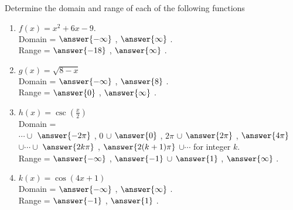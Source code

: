 \documentclass{ximera}
\author{Elizabeth Campolongo}
\begin{document}
\begin{exercise}
Determine the domain and range of each of the following functions
%
\begin{enumerate}

\item $f(x) = x^2+6x-9.$\\
Domain = \wordChoice{\choice[correct]{(}\choice{[}} $\answer{-\infty}$ , $\answer{\infty}$ \wordChoice{\choice[correct]{)}\choice{]}}.\\
Range = \wordChoice{\choice{(}\choice[correct]{[}} $\answer{-18}$ , $\answer{\infty}$ \wordChoice{\choice[correct]{)}\choice{]}}.


\item $g(x) = \sqrt{8-x} $\\
Domain = \wordChoice{\choice[correct]{(}\choice{[}} $\answer{-\infty}$ , $\answer{8}$ \wordChoice{\choice{)}\choice[correct]{]}}.\\
Range = \wordChoice{\choice{(}\choice[correct]{[}} $\answer{0}$ , $\answer{\infty}$ \wordChoice{\choice[correct]{)}\choice{]}}.


\item $h(x) = \csc\!\left(\frac{x}{2}\right)$\\
Domain = \\
$\cdots \cup$
\wordChoice{\choice[correct]{(}\choice{[}} $\answer{-2\pi}$ , 0 \wordChoice{\choice[correct]{)}\choice{]}} 
$\cup$ 
\wordChoice{\choice[correct]{(}\choice{[}} $\answer{0}$ , $2\pi$ \wordChoice{\choice[correct]{)}\choice{]}} 
$\cup$ 
\wordChoice{\choice[correct]{(}\choice{[}} $\answer{2\pi}$ , $\answer{4\pi}$ \wordChoice{\choice[correct]{)}\choice{]}} 
$\cup \cdots \cup$
\wordChoice{\choice[correct]{(}\choice{[}} $\answer{2k\pi}$ , $\answer{2(k+1)\pi}$ \wordChoice{\choice[correct]{)}\choice{]}}
$\cup \cdots$ for integer $k$.
\\
Range = \wordChoice{\choice[correct]{(}\choice{[}} 
$\answer{-\infty}$ , $\answer{-1}$ 
\wordChoice{\choice{)}\choice[correct]{]}} 
$\cup$  
\wordChoice{\choice{(}\choice[correct]{[}} 
$\answer{1}$ , $\answer{\infty}$ 
\wordChoice{\choice[correct]{)}\choice{]}}.

\item $k(x) = \cos(4x+1)$ \\
Domain = \wordChoice{\choice[correct]{(}\choice{[}} 
$\answer{-\infty}$ , $\answer{\infty}$ 
\wordChoice{\choice[correct]{)}\choice{]}}.\\
Range = \wordChoice{\choice{(}\choice[correct]{[}} $\answer{-1}$ , $\answer{1}$ \wordChoice{\choice{)}\choice[correct]{]}}.



\end{enumerate}
\end{exercise}
\end{document}
